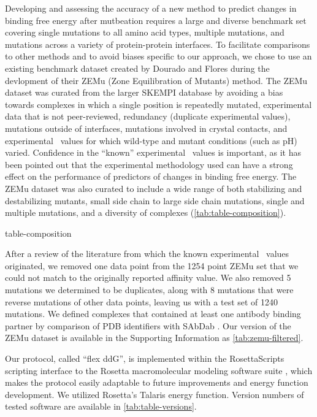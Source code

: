 Developing and assessing the accuracy of a new method to predict changes in binding free energy after mutbeation requires a large and diverse benchmark set covering single mutations to all amino acid types, multiple mutations, and mutations across a variety of protein-protein interfaces.
To facilitate comparisons to other methods and to avoid biases specific to our approach, we chose to use an existing benchmark dataset created by Dourado and Flores\cite{dourado_multiscale_2014} during the devlopment of their ZEMu (Zone Equilibration of Mutants) method.
The ZEMu dataset was curated from the larger SKEMPI database\cite{moal_skempi:_2012} by avoiding a bias towards complexes in which a single position is repeatedly mutated, experimental data that is not peer-reviewed, redundancy (duplicate experimental values), mutations outside of interfaces, mutations involved in crystal contacts, and experimental \ddg\ values for which wild-type and mutant conditions (such as pH) varied.
Confidence in the ``known'' experimental \ddg\ values is important, as it has been pointed out that the experimental methodology used can have a strong effect on the performance of predictors of changes in binding free energy\cite{geng_exploring_2016}.
The ZEMu dataset was also curated to include a wide range of both stabilizing and destabilizing mutants, small side chain to large side chain mutations, single and multiple mutations, and a diversity of complexes (\cref{tab:table-composition}).

{table-composition}

After a review of the literature from which the known experimental \ddg\ values originated, we removed one data point from the 1254 point ZEMu set that we could not match to the originally reported affinity value. We also removed 5 mutations we determined to be duplicates, along with 8 mutations that were reverse mutations of other data points, leaving us with a test set of 1240 mutations.
We defined complexes that contained at least one antibody binding partner by comparison of PDB identifiers with SAbDab \cite{dunbar_sabdab:_2014}.
Our version of the ZEMu dataset is available in the Supporting Information as \cref{tab:zemu-filtered}.

Our protocol, called ``flex ddG'', is implemented within the RosettaScripts scripting interface to the Rosetta macromolecular modeling software suite \cite{fleishman_rosettascripts:_2011}, which makes the protocol easily adaptable to future improvements and energy function development. We utilized Rosetta's Talaris \cite{leaver-fay_chapter_2013,song_structure-guided_2011,shapovalov_smoothed_2011} energy function.
Version numbers of tested software are available in \cref{tab:table-versions}.

